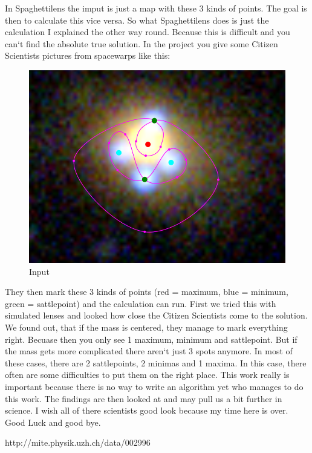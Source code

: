 \documentclass[pdftex,12pt,a4paper]{article}
\begin{document}
In Spaghettilens the imput is just a map with these 3 kinds of points. The goal is then to calculate this vice versa. So what Spaghettilens does is just the calculation I explained the other way round. Because this is difficult and you can`t find the absolute true solution. In the project you give some Citizen Scientists pictures from spacewarps like this:

\begin{figure}[position=h]
\centering
 \caption{Input}
 \includegraphics[width=12cm]{Bilder/workinput}%
\end{figure}

They then mark these 3 kinds of points (red = maximum, blue = minimum, green = sattlepoint) and the calculation can run. First we tried this with simulated lenses and looked how close the Citizen Scientists come to the solution. We found out, that if the mass is centered, they manage to mark everything right. Becuase then you only see 1 maximum, minimum and sattlepoint. But if the mass gets more complicated there aren`t just 3 spots anymore. In most of these cases, there are 2 sattlepoints, 2 minimas and 1 maxima. In this case, there often are some difficulties to put them on the right place. This work really is important because there is no way to write an algorithm yet who manages to do this work. The findings are then looked at and may pull us a bit further in science. I wish all of there scientists good look because my time here is over. Good Luck and good bye.

http://mite.physik.uzh.ch/data/002996
\end{document}
